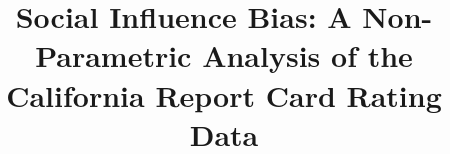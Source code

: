 \documentclass{sig-alternate}
\begin{document}
\title{Social Influence Bias: A Non-Parametric Analysis of the California Report Card Rating Data}

\linespread{0.95}%
\setlength{\belowdisplayskip}{1pt} \setlength{\belowdisplayshortskip}{1pt}
\setlength{\abovedisplayskip}{1pt} \setlength{\abovedisplayshortskip}{1pt}
\selectfont

%
%
%
%
%


%

\end{document}

